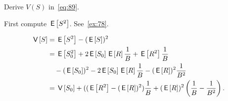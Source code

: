\begin{exercise}
Derive $V(S)$ in~\cref{eq:89}.
  \begin{hint}
    First compute $\E{S^2}$. See~\cref{ex:78}.
  \end{hint}
  \begin{solution}
    \begin{equation*}
      \begin{split}
\V{S} 
&=\E{S^2} - (\E{S})^2 \\
&= \E{S_0^2} + 2 \E{S_0} \E R\frac 1B + \E{R^2}\frac 1B  \\
&\quad - (\E{S_0})^2 - 2\E{S_0}\E R \frac 1 B - (\E R)^2\frac1{B^2}\\
&=  \V{S_0} + ((\E{R^2} - (\E R)^2)\frac 1 B + (\E R)^2\left(\frac 1B - \frac 1{B^2}\right).
      \end{split}
    \end{equation*}
  \end{solution}
\end{exercise}







